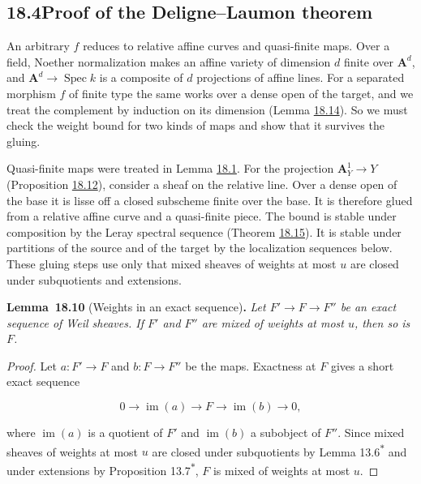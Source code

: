 \documentclass[11pt]{article}
\newenvironment{bpstatement}[2]{\par\addvspace{0.6\baselineskip}\noindent\textbf{#1}#2\textbf{.}\enspace\ignorespaces}
  {\par\addvspace{0.4\baselineskip}}
\newenvironment{bpstatementit}[2]{\begin{bpstatement}{#1}{#2}\itshape\ignorespaces}{\end{bpstatement}}
\newcommand{\bpout}[1]{#1\textsuperscript{\hyperlink{bp-outside}{\ensuremath{\ast}}}}
\begin{document}
\subsection*{\texorpdfstring{18.4\quad Proof of the Deligne–Laumon theorem}{18.4 Proof of the Deligne–Laumon theorem}}
\label{bp31}%
\label{bp32}%
An arbitrary \(f\) reduces to relative affine curves and quasi-finite maps. Over a field, Noether normalization makes an affine variety of dimension \(d\) finite over \(\mathbf A^d\), and \(\mathbf A^d\to\operatorname{Spec}k\) is a composite of \(d\) projections of affine lines. For a separated morphism \(f\) of finite type the same works over a dense open of the target, and we treat the complement by induction on its dimension (Lemma \hyperref[bp42]{18.14}). So we must check the weight bound for two kinds of maps and show that it survives the gluing.

Quasi-finite maps were treated in Lemma \hyperref[bp5]{18.1}. For the projection \(\mathbf A^1_Y\to Y\) (Proposition \hyperref[bp38]{18.12}), consider a sheaf on the relative line. Over a dense open of the base it is lisse off a closed subscheme finite over the base. It is therefore glued from a relative affine curve and a quasi-finite piece. The bound is stable under composition by the Leray spectral sequence (Theorem \hyperref[bp45]{18.15}). It is stable under partitions of the source and of the target by the localization sequences below. These gluing steps use only that mixed sheaves of weights at most \(u\) are closed under subquotients and extensions.

\label{bp33}%
\begin{bpstatementit}{Lemma~18.10}{ (Weights in an exact sequence)}
Let \(F'\to F\to F''\) be an exact sequence of Weil sheaves. If \(F'\) and \(F''\) are mixed of weights at most \(u\), then so is \(F\).
\end{bpstatementit}

\begin{proof}[{Proof}]\label{bp34}%
Let \(a:F'\to F\) and \(b:F\to F''\) be the maps. Exactness at \(F\) gives a short exact sequence

\[
0\to\operatorname{im}(a)\to F\to\operatorname{im}(b)\to0,
\]

where \(\operatorname{im}(a)\) is a quotient of \(F'\) and \(\operatorname{im}(b)\) a subobject of \(F''\). Since mixed sheaves of weights at most \(u\) are closed under subquotients by Lemma \bpout{13.6} and under extensions by Proposition \bpout{13.7}, \(F\) is mixed of weights at most \(u\).
\end{proof}
\end{document}
